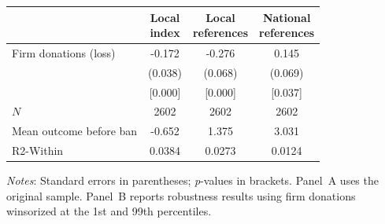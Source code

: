 \documentclass[12pt,a4paper]{article}
\begin{document}
\begin{table}[!htbp]
{
\def\sym#1{\ifmmode^{#1}\else\(^{#1}\)\fi}
\begin{tabular}{lccc}
\hline \hline
                & \shortstack{Local\\index}
                & \shortstack{Local\\references}
                & \shortstack{National\\references} \\
\hline
Firm donations (loss)
                &   -0.172         &   -0.276         &    0.145         \\
                &   (0.038)        &   (0.068)        &   (0.069)        \\
                &   [0.000]        &   [0.000]        &   [0.037]        \\
\(N\)           &     2602         &     2602         &     2602         \\
Mean outcome before ban
                &    -0.652        &     1.375        &     3.031        \\
R2-Within       &    0.0384        &     0.0273       &     0.0124       \\
\hline \hline
\end{tabular}
}
\vspace{1mm}
\begin{flushleft}
\footnotesize
\justifying
\textit{Notes}: Standard errors in parentheses; \textit{p}-values in brackets.
Panel~A uses the original sample.
Panel~B reports robustness results using firm donations winsorized at the 1st and 99th percentiles.
\end{flushleft}
\end{table}
\end{document}

